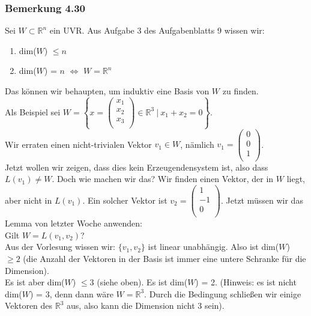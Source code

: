 \documentclass{article}
\begin{document}
\subsubsection*{Bemerkung 4.30}
Sei $W \subset \mathbb{R}^n$ ein UVR. Aus Aufgabe 3 des Aufgabenblatts 9 wissen wir: \\
\begin{enumerate}
    \item dim($W$) $\leq n$ \\
    \item dim($W$) = $n$ $\Leftrightarrow$ $W = \mathbb{R}^n$ \\
\end{enumerate}
Das können wir behaupten, um induktiv eine Basis von $W$ zu finden. \\
Als Beispiel sei $W = \left\{ x= \begin{pmatrix}
    x_1 \\
    x_2 \\
    x_3 \\
\end{pmatrix} \in \mathbb{R}^3 \ | \ x_1 + x_2 = 0 \right\}$. \\
Wir erraten einen nicht-trivialen Vektor $v_1 \in W$, nämlich $v_1 = \begin{pmatrix}
    0 \\
    0 \\
    1 \\
\end{pmatrix}$. \\
Jetzt wollen wir zeigen, dass dies kein Erzeugendensystem ist, also dass $L(v_1) \neq W$. Doch wie machen wir das? 
Wir finden einen Vektor, der in $W$ liegt, aber nicht in $L(v_1)$. Ein solcher Vektor ist $v_2 = \begin{pmatrix}
    1 \\
    -1 \\
    0 \\
\end{pmatrix}$. Jetzt müssen wir das Lemma von letzter Woche anwenden: \\
Gilt $W = L(v_1, v_2)$? \\
Aus der Vorlesung wissen wir: $\{v_1, v_2\}$ ist linear unabhängig. Also ist dim($W$) $\geq 2$ (die Anzahl der Vektoren in der Basis ist immer eine untere Schranke für die Dimension). \\
Es ist aber dim($W$) $\leq 3$ (siehe oben). Es ist dim($W$) = 2. (Hinweis: es ist nicht dim($W$) = 3, denn dann wäre $W = \mathbb{R}^3$. Durch die Bedingung schließen wir einige Vektoren des $\mathbb{R}^3$ aus, also kann die Dimension nicht 3 sein).
\\
\end{document}
